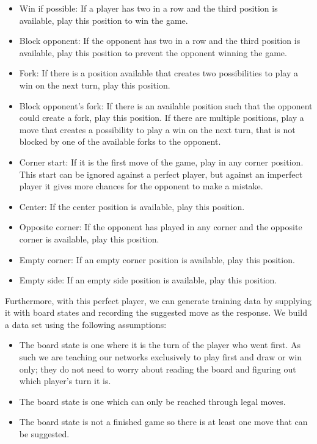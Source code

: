 \documentclass{somasmsc}
\begin{document}
\begin{itemize}
    \item Win if possible: If a player has two in a row and the third position is available, play this position to win the game.
    \item Block opponent: If the opponent has two in a row and the third position is available, play this position to prevent the opponent winning the game.
    \item Fork: If there is a position available that creates two possibilities to play a win on the next turn, play this position.
    \item Block opponent's fork: If there is an available position such that the opponent could create a fork, play this position. If there are multiple positions, play a move that creates a possibility to play a win on the next turn, that is not blocked by one of the available forks to the opponent.
    \item Corner start: If it is the first move of the game, play in any corner position. This start can be ignored against a perfect player, but against an imperfect player it gives more chances for the opponent to make a mistake.
    \item Center: If the center position is available, play this position.
    \item Opposite corner: If the opponent has played in any corner and the opposite corner is available, play this position.
    \item Empty corner: If an empty corner position is available, play this position.
    \item Empty side: If an empty side position is available, play this position.
\end{itemize}

Furthermore, with this perfect player, we can generate training data by supplying it with board states and recording the suggested move as the response. We build a data set using the following assumptions:
\begin{itemize}
    \item The board state is one where it is the turn of the player who went first. As such we are teaching our networks exclusively to play first and draw or win only; they do not need to worry about reading the board and figuring out which player's turn it is.
    \item The board state is one which can only be reached through legal moves.
    \item The board state is not a finished game so there is at least one move that can be suggested.
\end{itemize}
\end{document}
